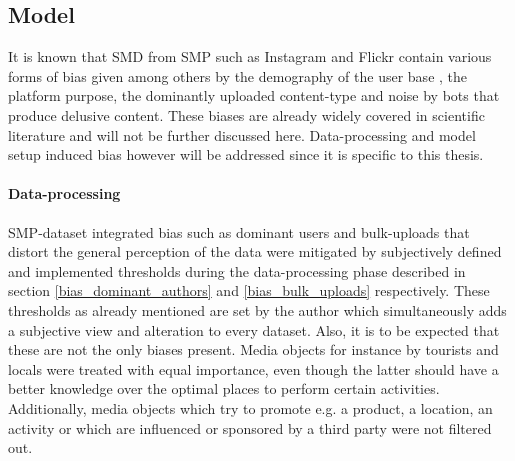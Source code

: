 \subsection*{Model}
It is known that SMD from SMP such as Instagram and Flickr contain various forms of bias given among others by the demography of the user base \parencite{Heikinheimo2017}, the platform purpose, the dominantly uploaded content-type and noise by bots \parencite{Edwards2014} that produce delusive content. These biases are already widely covered in scientific literature \parencite{Ruths2014, Lazer2014, Zook2017} and will not be further discussed here. Data-processing and model setup induced bias however will be addressed since it is specific to this thesis. \\

\paragraph*{Data-processing} SMP-dataset integrated bias such as dominant users and bulk-uploads that distort the general perception of the data were mitigated by subjectively defined and implemented thresholds during the data-processing phase described in section \ref{bias_dominant_authors} and \ref{bias_bulk_uploads} respectively. These thresholds as already mentioned are set by the author which simultaneously adds a subjective view and alteration to every dataset. Also, it is to be expected that these are not the only biases present. Media objects for instance by tourists and locals were treated with equal importance, even though the latter should have a better knowledge over the optimal places to perform certain activities. Additionally, media objects which try to promote e.g. a product, a location, an activity or which are influenced or sponsored by a third party were not filtered out.\\

